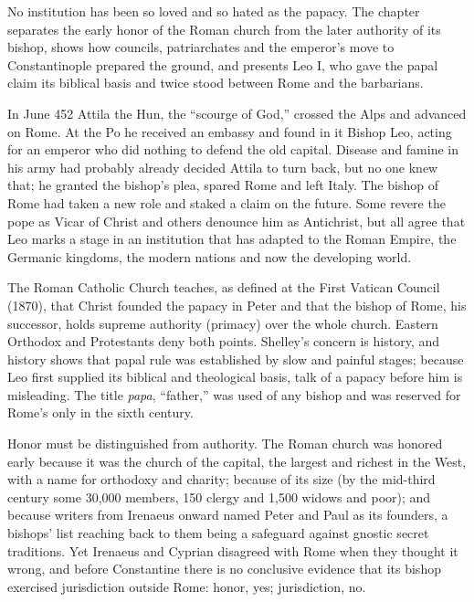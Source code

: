
\begin{inbrief}
No institution has been so loved and so hated as the papacy. The chapter separates the early honor of
the Roman church from the later authority of its bishop, shows how councils, patriarchates and the
emperor's move to Constantinople prepared the ground, and presents Leo I, who gave the papal claim its
biblical basis and twice stood between Rome and the barbarians.
\end{inbrief}

In June 452 Attila the Hun, the ``scourge of God,'' crossed the Alps and advanced on Rome. At the Po
he received an embassy and found in it Bishop Leo, acting for an emperor who did nothing to defend the
old capital. Disease and famine in his army had probably already decided Attila to turn back, but no
one knew that; he granted the bishop's plea, spared Rome and left Italy. The bishop of Rome had taken
a new role and staked a claim on the future. Some revere the pope as Vicar of Christ and others
denounce him as Antichrist, but all agree that Leo marks a stage in an institution that has adapted
to the Roman Empire, the Germanic kingdoms, the modern nations and now the developing world.

The Roman Catholic Church teaches, as defined at the First Vatican Council (1870), that Christ founded
the papacy in Peter and that the bishop of Rome, his successor, holds supreme authority (primacy) over
the whole church. Eastern Orthodox and Protestants deny both points. Shelley's concern is history, and
history shows that papal rule was established by slow and painful stages; because Leo first supplied
its biblical and theological basis, talk of a papacy before him is misleading. The title
\emph{papa}, ``father,'' was used of any bishop and was reserved for Rome's only in the sixth century.

Honor must be distinguished from authority. The Roman church was honored early because it was the
church of the capital, the largest and richest in the West, with a name for orthodoxy and charity;
because of its size (by the mid-third century some 30,000 members, 150 clergy and 1,500 widows and
poor); and because writers from Irenaeus onward named Peter and Paul as its founders, a bishops' list
reaching back to them being a safeguard against gnostic secret traditions. Yet Irenaeus and Cyprian
disagreed with Rome when they thought it wrong, and before Constantine there is no conclusive evidence
that its bishop exercised jurisdiction outside Rome: honor, yes; jurisdiction, no.

